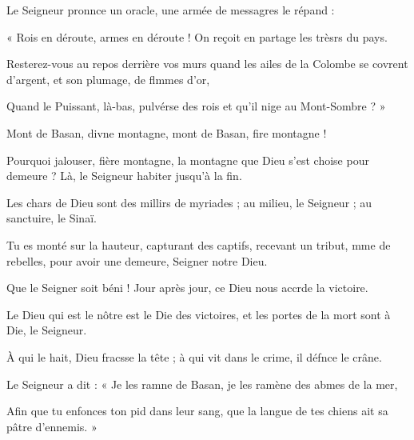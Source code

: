 \item Le Seigneur pronnce un oracle,\psstar{} une armée de messagres le répand :
\item « Rois en déroute, armes en déroute !\psstar{} On reçoit en partage les trèsrs du pays.
\item Resterez-vous au repos derrière vos murs\pscross{} quand les ailes de la Colombe se covrent d’argent,\psstar{} et son plumage, de flmmes d’or,
\item Quand le Puissant, là-bas, pulvérse des rois\psstar{} et qu’il nige au Mont-Sombre ? »
\item Mont de Basan, divne montagne,\psstar{} mont de Basan, fire montagne !
\item Pourquoi jalouser, fière montagne,\pscross{} la montagne que Dieu s’est choise pour demeure ?\psstar{} Là, le Seigneur habiter jusqu’à la fin.
\item Les chars de Dieu sont des millirs de myriades ;\psstar{} au milieu, le Seigneur ; au sanctuire, le Sinaï.
\item Tu es monté sur la hauteur, capturant des captifs,\pscross{} recevant un tribut, mme de rebelles,\psstar{} pour avoir une demeure, Seigner notre Dieu.
\item Que le Seigner soit béni !\psstar{} Jour après jour, ce Dieu nous accrde la victoire.
\item Le Dieu qui est le nôtre est le Die des victoires,\psstar{} et les portes de la mort sont à Die, le Seigneur.
\item À qui le hait, Dieu fracsse la tête ;\psstar{} à qui vit dans le crime, il défnce le crâne.
\item Le Seigneur a dit : « Je les ramne de Basan,\psstar{} je les ramène des abmes de la mer,
\item Afin que tu enfonces ton pid dans leur sang,\psstar{} que la langue de tes chiens ait sa pâtre d’ennemis. »